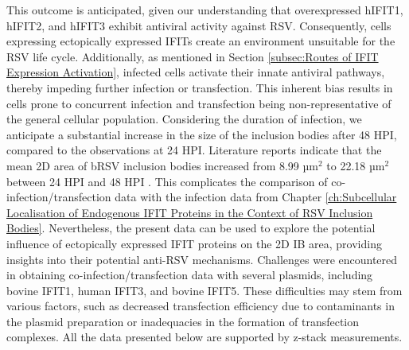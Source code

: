 This outcome is anticipated, given our understanding that overexpressed hIFIT1, hIFIT2, and hIFIT3 exhibit antiviral activity against RSV. Consequently, cells expressing ectopically expressed IFITs create an environment unsuitable for the RSV life cycle. Additionally, as mentioned in Section \ref{subsec:Routes of IFIT Expression Activation}, infected cells activate their innate antiviral pathways, thereby impeding further infection or transfection. This inherent bias results in cells prone to concurrent infection and transfection being non-representative of the general cellular population. Considering the duration of infection, we anticipate a substantial increase in the size of the inclusion bodies after 48 HPI, compared to the observations at 24 HPI. Literature reports indicate that the mean 2D area of bRSV inclusion bodies increased from 8.99 \(\mbox{µm}^2\) to 22.18 \(\mbox{µm}^2\) between 24 HPI and 48 HPI \cite{Jobe2021BovineResponses}. This complicates the comparison of co-infection/transfection data with the infection data from Chapter \ref{ch:Subcellular Localisation of Endogenous IFIT Proteins in the Context of RSV Inclusion Bodies}. Nevertheless, the present data can be used to explore the potential influence of ectopically expressed IFIT proteins on the 2D IB area, providing insights into their potential anti-RSV mechanisms. Challenges were encountered in obtaining co-infection/transfection data with several plasmids, including bovine IFIT1, human IFIT3, and bovine IFIT5. These difficulties may stem from various factors, such as decreased transfection efficiency due to contaminants in the plasmid preparation or inadequacies in the formation of transfection complexes. All the data presented below are supported by z-stack measurements.


